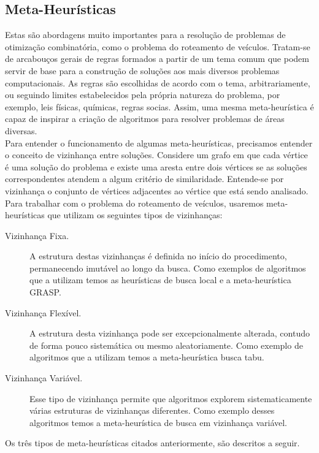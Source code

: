 \documentclass[12pt,a4paper]{article}
\begin{document}
\subsection{Meta-Heurísticas}

Estas são abordagens muito importantes para a resolução de problemas de otimização combinatória, como o problema do roteamento de veículos. Tratam-se de arcabouços gerais de regras formados a partir de um tema comum que podem servir de base para a construção de soluções aos mais diversos problemas computacionais. As regras são escolhidas de acordo com o tema, arbitrariamente, ou seguindo limites estabelecidos pela própria natureza do problema, por exemplo, leis físicas, químicas, regras socias. Assim, uma mesma meta-heurística é capaz de inspirar a criação de algoritmos para resolver problemas de áreas diversas. \\
Para entender o funcionamento de algumas meta-heurísticas, precisamos entender o conceito de vizinhança entre soluções. Considere um grafo em que cada vértice é uma solução do problema e existe uma aresta entre dois vértices se as soluções correspondentes atendem a algum critério de similaridade. Entende-se por vizinhança o conjunto de vértices adjacentes ao vértice que está sendo analisado. Para trabalhar com o problema do roteamento de veículos, usaremos meta-heurísticas que utilizam os seguintes tipos de vizinhanças:  
\begin{description}
\item[Vizinhança Fixa.] A estrutura destas vizinhanças é definida no início do procedimento, permanecendo imutável ao longo da busca. Como exemplos de algoritmos que a utilizam temos as heurísticas de busca local e a meta-heurística GRASP.

\item[Vizinhança Flexível.] A estrutura desta vizinhança pode ser excepcionalmente alterada, contudo de forma pouco sistemática ou mesmo aleatoriamente. Como exemplo de algoritmos que a utilizam temos a meta-heurística busca tabu.

\item[Vizinhança Variável.] Esse tipo de vizinhança permite que algoritmos explorem sistematicamente várias estruturas de vizinhanças diferentes. Como exemplo desses algoritmos temos a meta-heurística de busca em vizinhança variável.
\end{description}

Os três tipos de meta-heurísticas citados anteriormente, são descritos a seguir.
\end{document}

